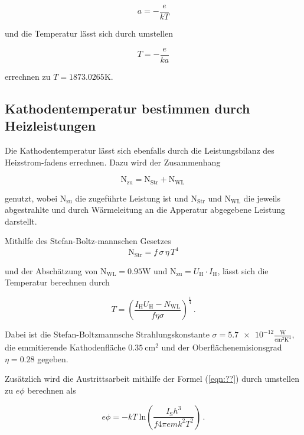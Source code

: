 \begin{equation*}
      a = - \frac{e}{kT} 
\end{equation*}

und die Temperatur lässt sich durch umstellen 

\begin{equation*}
    T = - \frac{e}{ka} 
\end{equation*}

errechnen zu $ T = 1873.0265 \si{\kelvin}$.

\subsection{Kathodentemperatur bestimmen durch Heizleistungen}
Die Kathodentemperatur lässt sich ebenfalls durch die Leistungsbilanz des Heizstrom-fadens errechnen. Dazu wird der Zusammenhang

\begin{equation}
    \label{eqn:zu}
    \text{N}_\text{zu} = \text{N}_\text{Str} + \text{N}_\text{WL} \,
\end{equation}

genutzt, wobei $\text{N}_\text{zu}$ die zugeführte Leistung ist und $\text{N}_\text{Str}$ und $\text{N}_\text{WL}$ die jeweils abgestrahlte und durch Wärmeleitung an die Apperatur abgegebene Leistung
darstellt.

Mithilfe des Stefan-Boltz-mannschen Gesetzes
\begin{equation*}
    \text{N}_\text{Str} = f \, \sigma \, \eta \, T^4
\end{equation*}

und der Abschätzung von $\text{N}_\text{WL} = 0.95 \si{\watt}$ und $\text{N}_\text{zu} = U_\text{H} \cdot I_\text{H}$, lässt sich die Temperatur berechnen durch

\begin{equation}
    T = \left( \frac{I_\text{H} U_\text{H} - N_\text{WL}}{f \eta \sigma} \right)^{\frac{1}{4}} \, .
    \label{eqn:temp}
\end{equation}

Dabei ist die Stefan-Boltzmannsche Strahlungskonstante $\sigma = \num{5.7e-12}\frac{\text{W}}{\text{cm}^2\text{K}^4}$, die emmitierende Kathodenfläche
$\SI{0.35}{\centi\meter\squared}$ und der Oberflächenemisionsgrad $\eta = \num{0.28}$ gegeben.

Zusätzlich wird die Austrittsarbeit mithilfe der Formel (\ref{eqn:??}) durch umstellen zu $ e \phi$ berechnen als

\begin{equation}
    e \phi = -k T \: \text{ln} \left( \frac{I_\text{S} h^3}{f 4 \pi e m k^2 T^2} \right) \, .
    \label{eqn:ephi}
\end{equation}

